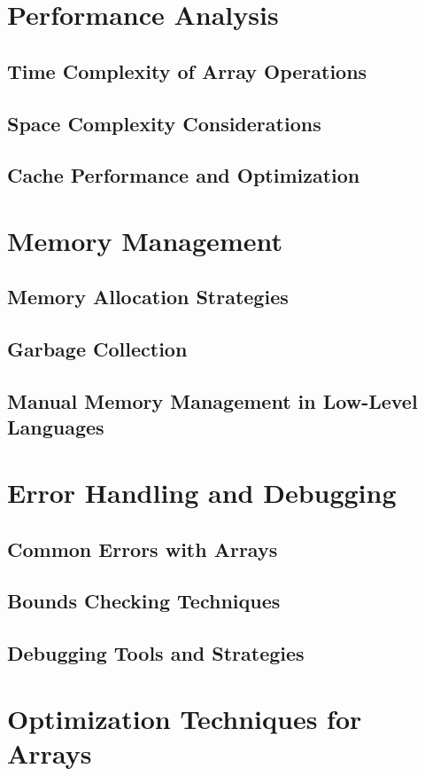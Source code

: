 \documentclass[12pt, oneside]{book}
\begin{document}
	\chapter{Performance Analysis}
	\section{Time Complexity of Array Operations}
	\section{Space Complexity Considerations}
	\section{Cache Performance and Optimization}
	
	\chapter{Memory Management}
	\section{Memory Allocation Strategies}
	\section{Garbage Collection}
	\section{Manual Memory Management in Low-Level Languages}
	
	\chapter{Error Handling and Debugging}
	\section{Common Errors with Arrays}
	\section{Bounds Checking Techniques}
	\section{Debugging Tools and Strategies}
	
	\chapter{Optimization Techniques for Arrays}
\end{document}
